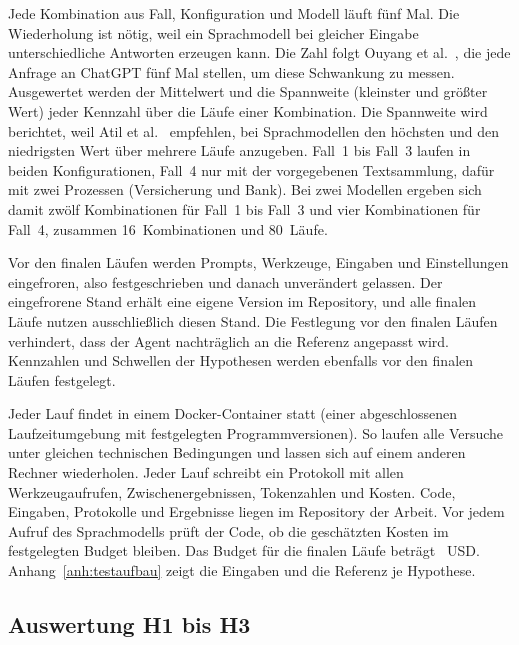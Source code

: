 Jede Kombination aus Fall, Konfiguration und Modell läuft fünf Mal.
Die Wiederholung ist nötig, weil ein Sprachmodell bei gleicher Eingabe unterschiedliche Antworten erzeugen kann.
Die Zahl folgt Ouyang et al.~\cite{ouyang2025}, die jede Anfrage an ChatGPT fünf Mal stellen, um diese Schwankung zu messen.
Ausgewertet werden der Mittelwert und die Spannweite (kleinster und größter Wert) jeder Kennzahl über die Läufe einer Kombination.
Die Spannweite wird berichtet, weil Atil et al.~\cite{atil2025} empfehlen, bei Sprachmodellen den höchsten und den niedrigsten Wert über mehrere Läufe anzugeben.
Fall~1 bis Fall~3 laufen in beiden Konfigurationen, Fall~4 nur mit der vorgegebenen Textsammlung, dafür mit zwei Prozessen (Versicherung und Bank).
Bei zwei Modellen ergeben sich damit zwölf Kombinationen für Fall~1 bis Fall~3 und vier Kombinationen für Fall~4, zusammen 16~Kombinationen und 80~Läufe.

Vor den finalen Läufen werden Prompts, Werkzeuge, Eingaben und Einstellungen eingefroren, also festgeschrieben und danach unverändert gelassen.
Der eingefrorene Stand erhält eine eigene Version im Repository, und alle finalen Läufe nutzen ausschließlich diesen Stand.
Die Festlegung vor den finalen Läufen verhindert, dass der Agent nachträglich an die Referenz angepasst wird.
Kennzahlen und Schwellen der Hypothesen werden ebenfalls vor den finalen Läufen festgelegt.

Jeder Lauf findet in einem Docker-Container statt (einer abgeschlossenen Laufzeitumgebung mit festgelegten Programmversionen).
So laufen alle Versuche unter gleichen technischen Bedingungen und lassen sich auf einem anderen Rechner wiederholen.
Jeder Lauf schreibt ein Protokoll mit allen Werkzeugaufrufen, Zwischenergebnissen, Tokenzahlen und Kosten.
Code, Eingaben, Protokolle und Ergebnisse liegen im Repository der Arbeit.
Vor jedem Aufruf des Sprachmodells prüft der Code, ob die geschätzten Kosten im festgelegten Budget bleiben.
Das Budget für die finalen Läufe beträgt ~USD.
Anhang~\ref{anh:testaufbau} zeigt die Eingaben und die Referenz je Hypothese.

\subsection{Auswertung H1 bis H3}\label{sec:auswertung_h1_h3}
